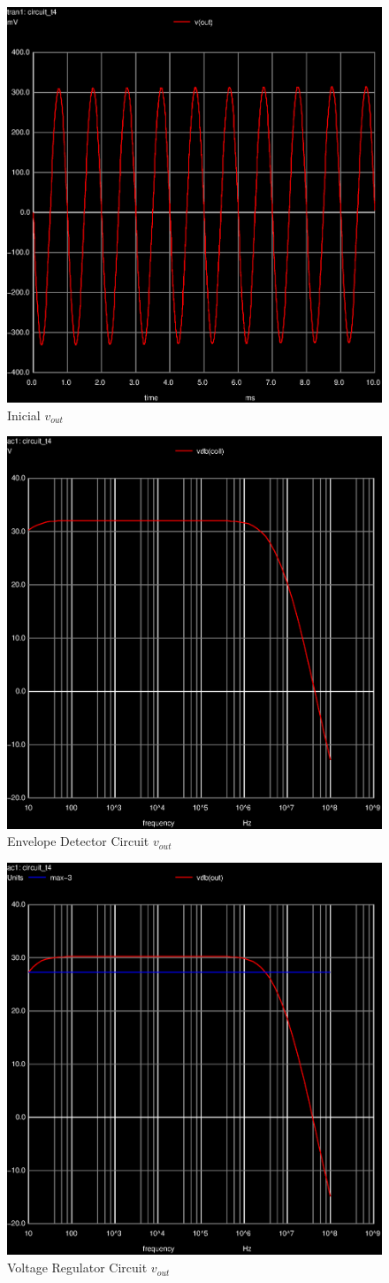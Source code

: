 \begin{figure}[ht]
	\centering
	\includegraphics[width=0.6\linewidth]{vo1.eps}
	\caption{Inicial $v_{out}$}
\label{fig:graph_global}
\end{figure}

\begin{figure}[ht]
	\centering
	\includegraphics[width=0.6\linewidth]{vo1f.eps}
	\caption{Envelope Detector Circuit $v_{out}$}
\label{fig:EV_vout}
\end{figure}

\begin{figure}[ht]
	\centering
	\includegraphics[width=0.6\linewidth]{vo2f.eps}
	\caption{Voltage Regulator Circuit $v_{out}$}
\label{fig:VR_vout}
\end{figure}



